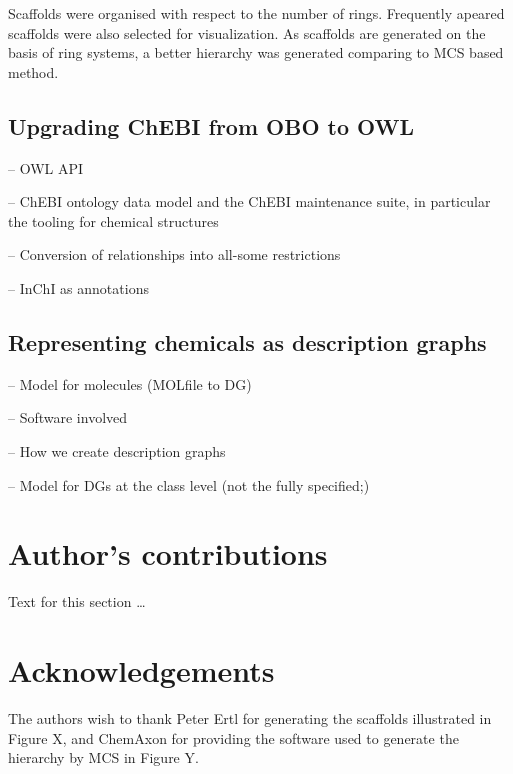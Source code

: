 \documentclass[10pt]{bmc_article}
\newenvironment{bmcformat}{\baselineskip20pt\sloppy\setboolean{publ}{false}}{\baselineskip20pt\sloppy}
\begin{document}
\begin{bmcformat}
Scaffolds were organised with respect to the number of rings. Frequently apeared scaffolds were also selected for visualization. As scaffolds are generated on the basis of ring systems, a better hierarchy was generated comparing to MCS based method.

\subsection*{Upgrading ChEBI from OBO to OWL}

-- OWL API

-- ChEBI ontology data model and the ChEBI maintenance suite, in particular the tooling for chemical structures

-- Conversion of relationships into all-some restrictions

-- InChI as annotations

\subsection*{Representing chemicals as description graphs}
-- Model for molecules (MOLfile to DG)

-- Software involved

-- How we create description graphs

-- Model for DGs at the class level (not the fully specified;)



\bigskip


\section*{Author's contributions}
    Text for this section \ldots

    

\section*{Acknowledgements}
  The authors wish to thank Peter Ertl for generating the scaffolds illustrated in Figure X, and ChemAxon for providing the software used to generate the hierarchy by MCS in Figure Y. 
 


\end{bmcformat}
\end{document}
